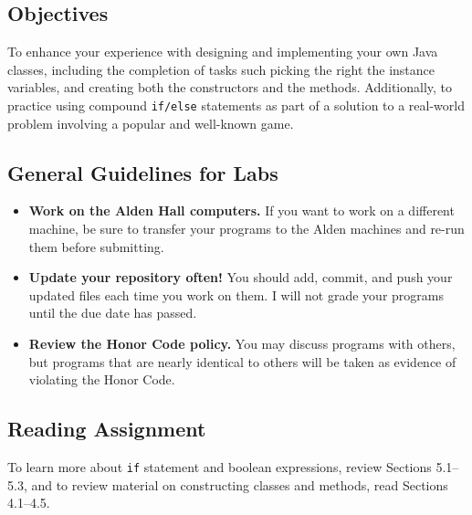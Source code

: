 



\vspace{-0.2in}
\subsection*{Objectives}
\vspace{-0.05in}

To enhance your experience with designing and implementing your own Java classes, including the completion of tasks such
picking the right the instance variables, and creating both the constructors and the methods.  Additionally, to practice
using compound {\tt if/else} statements as part of a solution to a real-world problem involving a popular and well-known
game.

\vspace{-0.15in}
\subsection*{General Guidelines for Labs}
\vspace{-0.05in}
\begin{itemize}
\item
{\bf Work on the Alden Hall computers.} If you want to work on a different
machine, be sure to transfer your programs to the Alden
machines and re-run them before submitting.
\item
{\bf Update your repository often!} You should add, commit, 
and push your updated files each time you work on them.  I will not grade 
your programs until the due date has passed.
\item
{\bf Review the Honor Code policy.} You
may discuss programs with others, but programs that are nearly identical
to others will be taken as evidence of violating the Honor Code.
\end{itemize}

\vspace{-0.15in}
\subsection*{Reading Assignment}
\vspace{-0.05in}
To learn more about {\tt if} statement and boolean expressions, review Sections 5.1--5.3, and to review material on constructing classes and methods, read Sections 4.1--4.5. 

